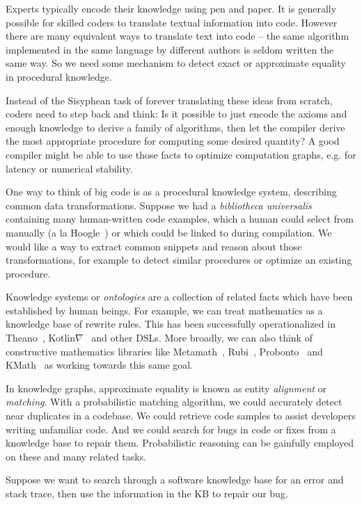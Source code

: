 \documentclass[11pt]{article}
\begin{document}
    Experts typically encode their knowledge using pen and paper. It is generally possible for skilled coders to translate textual information into code. However there are many equivalent ways to translate text into code -- the same algorithm implemented in the same language by different authors is seldom written the same way. So we need some mechanism to detect exact or approximate equality in procedural knowledge.

    Instead of the Sisyphean task of forever translating these ideas from scratch, coders need to step back and think: Is it possible to just encode the axioms and enough knowledge to derive a family of algorithms, then let the compiler derive the most appropriate procedure for computing some desired quantity? A good compiler might be able to use those facts to optimize computation graphs, e.g. for latency or numerical stability.

    One way to think of big code is as a procedural knowledge system, describing common data transformations. Suppose we had a \textit{bibliotheca universalis} containing many human-written code examples, which a human could select from manually (a la Hoogle~\citep{james2020digging}) or which could be linked to during compilation. We would like a way to extract common snippets and reason about those transformations, for example to detect similar procedures or optimize an existing procedure.

    Knowledge systems or \textit{ontologies} are a collection of related facts which have been established by human beings. For example, we can treat mathematics as a knowledge base of rewrite rules. This has been successfully operationalized in Theano~\citep{bergstra2010theano}, Kotlin$\nabla$~\citep{considine2019kotlingrad} and other DSLs. More broadly, we can also think of constructive mathematics libraries like Metamath~\citep{megill2006metamath}, Rubi~\citep{rich2009knowledge}, Probonto~\citep{swat2016probonto} and KMath~\citep{nozik2019kotlin} as working towards this same goal.

    In knowledge graphs, approximate equality is known as entity \textit{alignment} or \textit{matching}. With a probabilistic matching algorithm, we could accurately detect near duplicates in a codebase. We could retrieve code samples to assist developers writing unfamiliar code. And we could search for bugs in code or fixes from a knowledge base to repair them. Probabilistic reasoning can be gainfully employed on these and many related tasks.

    Suppose we want to search through a software knowledge base for an error and stack trace, then use the information in the KB to repair our bug.
\end{document}
